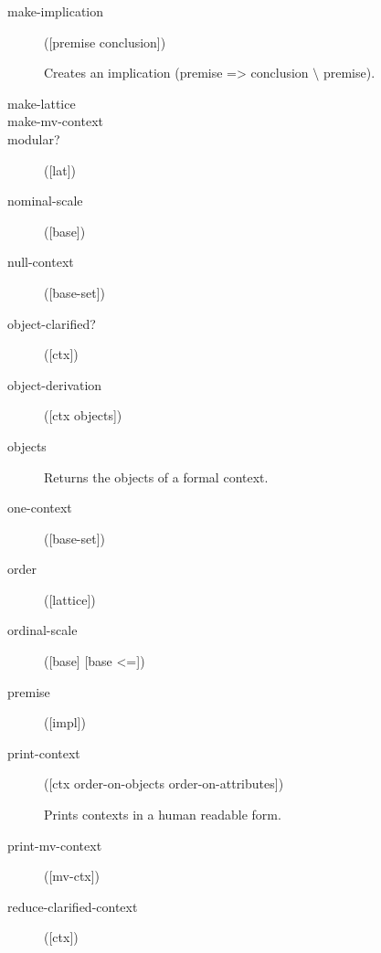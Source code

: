 \begin{description}
  \item[make-implication]
([premise conclusion])

Creates an implication (premise => conclusion $\setminus$ premise).

  \item[make-lattice]




  \item[make-mv-context]




  \item[modular?]
([lat])



  \item[nominal-scale]
([base])



  \item[null-context]
([base-set])



  \item[object-clarified?]
([ctx])



  \item[object-derivation]
([ctx objects])



  \item[objects]


Returns the objects of a formal context.

  \item[one-context]
([base-set])



  \item[order]
([lattice])



  \item[ordinal-scale]
([base] [base <=])



  \item[premise]
([impl])



  \item[print-context]
([ctx order-on-objects order-on-attributes])

Prints contexts in a human readable form.

  \item[print-mv-context]
([mv-ctx])



  \item[reduce-clarified-context]
([ctx])




\end{description}
